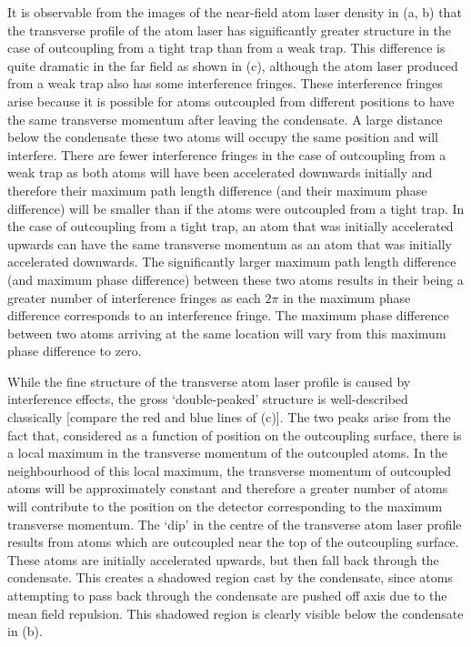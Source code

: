 It is observable from the images of the near-field atom laser density in (a, b) that the transverse profile of the atom laser has significantly greater structure in the case of outcoupling from a tight trap than from a weak trap. This difference is quite dramatic in the far field as shown in (c), although the atom laser produced from a weak trap also has some interference fringes.  These interference fringes arise because it is possible for atoms outcoupled from different positions to have the same transverse momentum after leaving the condensate.  A large distance below the condensate these two atoms will occupy the same position and will interfere.  There are fewer interference fringes in the case of outcoupling from a weak trap as both atoms will have been accelerated downwards initially and therefore their maximum path length difference (and their maximum phase difference) will be smaller than if the atoms were outcoupled from a tight trap.  In the case of outcoupling from a tight trap, an atom that was initially accelerated upwards can have the same transverse momentum as an atom that was initially accelerated downwards.  The significantly larger maximum path length difference (and maximum phase difference) between these two atoms results in their being a greater number of interference fringes as each $2\pi$ in the maximum phase difference corresponds to an interference fringe.  The maximum phase difference between two atoms arriving at the same location will vary from this maximum phase difference to zero.

While the fine structure of the transverse atom laser profile is caused by interference effects, the gross `double-peaked' structure is well-described classically [compare the red and blue lines of (c)].  The two peaks arise from the fact that, considered as a function of position on the outcoupling surface, there is a local maximum in the transverse momentum of the outcoupled atoms.  In the neighbourhood of this local maximum, the transverse momentum of outcoupled atoms will be approximately constant and therefore a greater number of atoms will contribute to the position on the detector corresponding to the maximum transverse momentum.  The `dip' in the centre of the transverse atom laser profile results from atoms which are outcoupled near the top of the outcoupling surface.  These atoms are initially accelerated upwards, but then fall back through the condensate.  This creates a shadowed region cast by the condensate, since atoms attempting to pass back through the condensate are pushed off axis due to the mean field repulsion.  This shadowed region is clearly visible below the condensate in (b).

